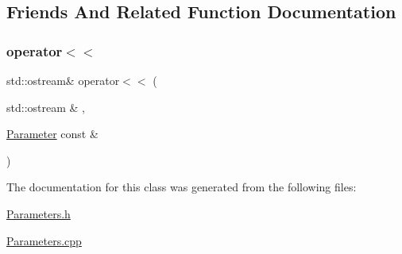 \subsection{Friends And Related Function Documentation}
\mbox{\label{class_parameter_a062fa105b64c362071304bc5f2eb350a}} 
\subsubsection{\texorpdfstring{operator$<$$<$}{operator<<}}
{\footnotesize\ttfamily std\+::ostream\& operator$<$$<$ (\begin{DoxyParamCaption}\item[{std\+::ostream \&}]{,  }\item[{\mbox{\hyperlink{class_parameter}{Parameter}} const \&}]{ }\end{DoxyParamCaption})\hspace{0.3cm}{\ttfamily [friend]}}



The documentation for this class was generated from the following files\+:\begin{DoxyCompactItemize}
\item 
\mbox{\hyperlink{_parameters_8h}{Parameters.\+h}}\item 
\mbox{\hyperlink{_parameters_8cpp}{Parameters.\+cpp}}\end{DoxyCompactItemize}
